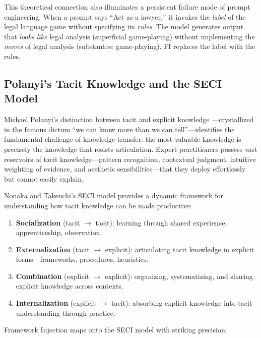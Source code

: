 \documentclass[12pt,a4paper]{article}
\begin{document}
This theoretical connection also illuminates a persistent failure mode of prompt engineering. When a prompt says ``Act as a lawyer,'' it invokes the \emph{label} of the legal language game without specifying its \emph{rules}. The model generates output that \emph{looks like} legal analysis (superficial game-playing) without implementing the \emph{moves} of legal analysis (substantive game-playing). FI replaces the label with the rules.

\subsection{Polanyi's Tacit Knowledge and the SECI Model}

Michael Polanyi's distinction between tacit and explicit knowledge \cite{polanyi1966}---crystallized in the famous dictum ``we can know more than we can tell''---identifies the fundamental challenge of knowledge transfer: the most valuable knowledge is precisely the knowledge that resists articulation. Expert practitioners possess vast reservoirs of tacit knowledge---pattern recognition, contextual judgment, intuitive weighting of evidence, and aesthetic sensibilities---that they deploy effortlessly but cannot easily explain.

Nonaka and Takeuchi's SECI model \cite{nonaka1995} provides a dynamic framework for understanding how tacit knowledge can be made productive:

\begin{enumerate}
  \item \textbf{Socialization} (tacit $\to$ tacit): learning through shared experience, apprenticeship, observation.
  \item \textbf{Externalization} (tacit $\to$ explicit): articulating tacit knowledge in explicit forms---frameworks, procedures, heuristics.
  \item \textbf{Combination} (explicit $\to$ explicit): organizing, systematizing, and sharing explicit knowledge across contexts.
  \item \textbf{Internalization} (explicit $\to$ tacit): absorbing explicit knowledge into tacit understanding through practice.
\end{enumerate}

Framework Injection maps onto the SECI model with striking precision:
\end{document}
